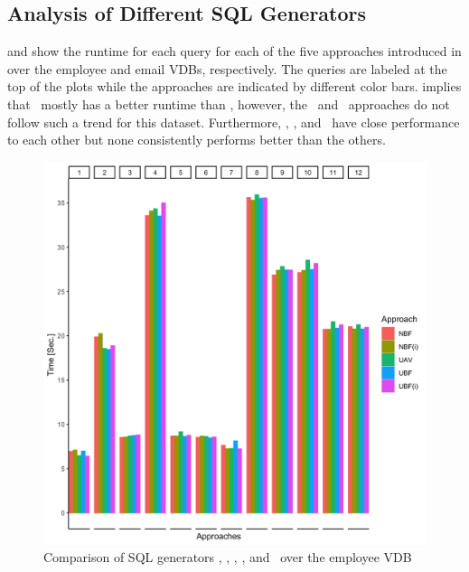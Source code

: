 \subsection{Analysis of Different SQL Generators}
\label{sec:exp-gen}







 and  show the runtime for each query
for each of the five approaches introduced in  over the employee and email VDBs, respectively. 
The queries are labeled at the top of the plots while the 
approaches are indicated by different color bars.
%
 implies that  \nbfi\ mostly has a better
runtime than \nbf, however, the \ubf\ and \ubfi\ approaches do not follow such a trend for this dataset. 
Furthermore, 
\nbfi, \uav, and \ubf\ have close performance to each other but none consistently performs 
better than the others. 
%

\begin{figure}[!t]
\centering
\includegraphics[scale=0.12] {figs/plots/emp1-5.png}
\caption[Comparison of SQL generators \nbf, \nbfi, \uav, \ubf, and \ubfi\ over the employee VDB]{Comparison of SQL generators \nbf, \nbfi, \uav, \ubf, and \ubfi\ over the employee VDB}
\label{fig:emp1-5}
\end{figure}

